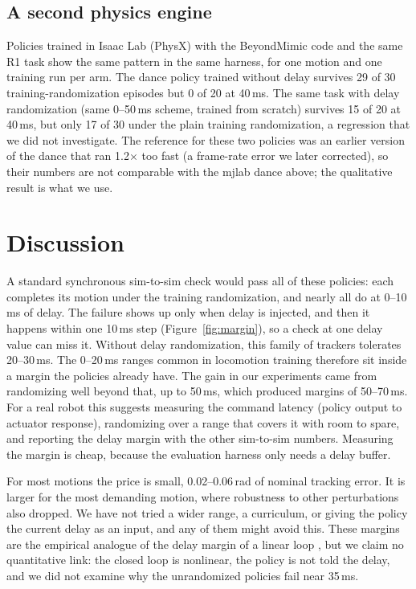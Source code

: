 \documentclass{l4dc2026}
\begin{document}
\subsection{A second physics engine}
\label{sec:cross}

Policies trained in Isaac Lab (PhysX) with the BeyondMimic code and the same R1 task show the same pattern in the same harness, for one motion and one training run per arm.
The dance policy trained without delay survives 29 of 30 training-randomization episodes but 0 of 20 at 40\,ms.
The same task with delay randomization (same 0--50\,ms scheme, trained from scratch) survives 15 of 20 at 40\,ms, but only 17 of 30 under the plain training randomization, a regression that we did not investigate.
The reference for these two policies was an earlier version of the dance that ran 1.2$\times$ too fast (a frame-rate error we later corrected), so their numbers are not comparable with the mjlab dance above; the qualitative result is what we use.

\section{Discussion}

A standard synchronous sim-to-sim check would pass all of these policies: each completes its motion under the training randomization, and nearly all do at 0--10\,ms of delay.
The failure shows up only when delay is injected, and then it happens within one 10\,ms step (Figure~\ref{fig:margin}), so a check at one delay value can miss it.
Without delay randomization, this family of trackers tolerates 20--30\,ms.
The 0--20\,ms ranges common in locomotion training therefore sit inside a margin the policies already have.
The gain in our experiments came from randomizing well beyond that, up to 50\,ms, which produced margins of 50--70\,ms.
For a real robot this suggests measuring the command latency (policy output to actuator response), randomizing over a range that covers it with room to spare, and reporting the delay margin with the other sim-to-sim numbers.
Measuring the margin is cheap, because the evaluation harness only needs a delay buffer.

For most motions the price is small, 0.02--0.06\,rad of nominal tracking error.
It is larger for the most demanding motion, where robustness to other perturbations also dropped.
We have not tried a wider range, a curriculum, or giving the policy the current delay as an input, and any of them might avoid this.
These margins are the empirical analogue of the delay margin of a linear loop \citep{richard2003time}, but we claim no quantitative link: the closed loop is nonlinear, the policy is not told the delay, and we did not examine why the unrandomized policies fail near 35\,ms.
\end{document}
